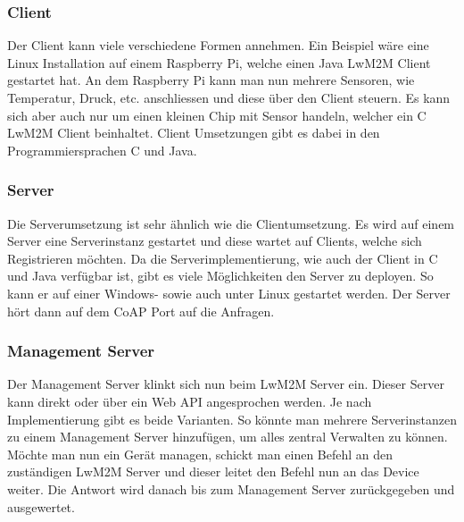 \subsubsection{Client}
Der Client kann viele verschiedene Formen annehmen. Ein Beispiel wäre eine Linux Installation auf einem Raspberry Pi, welche einen Java LwM2M Client gestartet hat. An dem Raspberry Pi kann man nun mehrere Sensoren, wie Temperatur, Druck, etc. anschliessen und diese über den Client steuern. Es kann sich aber auch nur um einen kleinen Chip mit Sensor handeln, welcher ein C LwM2M Client beinhaltet. Client Umsetzungen gibt es dabei in den Programmiersprachen C und Java.
\subsubsection{Server}
Die Serverumsetzung ist sehr ähnlich wie die Clientumsetzung. Es wird auf einem Server eine Serverinstanz gestartet und diese wartet auf Clients, welche sich Registrieren möchten. Da die Serverimplementierung, wie auch der Client in C und Java verfügbar ist, gibt es viele Möglichkeiten den Server zu deployen. So kann er auf einer Windows- sowie auch unter Linux gestartet werden. Der Server hört dann auf dem CoAP Port auf die Anfragen.
\subsubsection{Management Server}
Der Management Server klinkt sich nun beim LwM2M Server ein. Dieser Server kann direkt oder über ein Web API angesprochen werden. Je nach Implementierung gibt es beide Varianten. So könnte man mehrere Serverinstanzen zu einem Management Server hinzufügen, um alles zentral Verwalten zu können. Möchte man nun ein Gerät managen, schickt man einen Befehl an den zuständigen LwM2M Server und dieser leitet den Befehl nun an das Device weiter. Die Antwort wird danach bis zum Management Server zurückgegeben und ausgewertet. 
